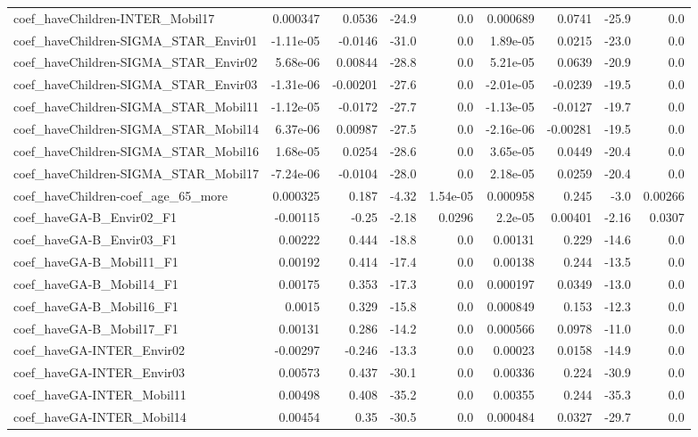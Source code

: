 \begin{tabular}{lrrrrrrrr}
coef_haveChildren-INTER_Mobil17 & 0.000347 & 0.0536 & -24.9 & 0.0 & 0.000689 & 0.0741 & -25.9 & 0.0 \\
coef_haveChildren-SIGMA_STAR_Envir01 & -1.11e-05 & -0.0146 & -31.0 & 0.0 & 1.89e-05 & 0.0215 & -23.0 & 0.0 \\
coef_haveChildren-SIGMA_STAR_Envir02 & 5.68e-06 & 0.00844 & -28.8 & 0.0 & 5.21e-05 & 0.0639 & -20.9 & 0.0 \\
coef_haveChildren-SIGMA_STAR_Envir03 & -1.31e-06 & -0.00201 & -27.6 & 0.0 & -2.01e-05 & -0.0239 & -19.5 & 0.0 \\
coef_haveChildren-SIGMA_STAR_Mobil11 & -1.12e-05 & -0.0172 & -27.7 & 0.0 & -1.13e-05 & -0.0127 & -19.7 & 0.0 \\
coef_haveChildren-SIGMA_STAR_Mobil14 & 6.37e-06 & 0.00987 & -27.5 & 0.0 & -2.16e-06 & -0.00281 & -19.5 & 0.0 \\
coef_haveChildren-SIGMA_STAR_Mobil16 & 1.68e-05 & 0.0254 & -28.6 & 0.0 & 3.65e-05 & 0.0449 & -20.4 & 0.0 \\
coef_haveChildren-SIGMA_STAR_Mobil17 & -7.24e-06 & -0.0104 & -28.0 & 0.0 & 2.18e-05 & 0.0259 & -20.4 & 0.0 \\
coef_haveChildren-coef_age_65_more & 0.000325 & 0.187 & -4.32 & 1.54e-05 & 0.000958 & 0.245 & -3.0 & 0.00266 \\
coef_haveGA-B_Envir02_F1 & -0.00115 & -0.25 & -2.18 & 0.0296 & 2.2e-05 & 0.00401 & -2.16 & 0.0307 \\
coef_haveGA-B_Envir03_F1 & 0.00222 & 0.444 & -18.8 & 0.0 & 0.00131 & 0.229 & -14.6 & 0.0 \\
coef_haveGA-B_Mobil11_F1 & 0.00192 & 0.414 & -17.4 & 0.0 & 0.00138 & 0.244 & -13.5 & 0.0 \\
coef_haveGA-B_Mobil14_F1 & 0.00175 & 0.353 & -17.3 & 0.0 & 0.000197 & 0.0349 & -13.0 & 0.0 \\
coef_haveGA-B_Mobil16_F1 & 0.0015 & 0.329 & -15.8 & 0.0 & 0.000849 & 0.153 & -12.3 & 0.0 \\
coef_haveGA-B_Mobil17_F1 & 0.00131 & 0.286 & -14.2 & 0.0 & 0.000566 & 0.0978 & -11.0 & 0.0 \\
coef_haveGA-INTER_Envir02 & -0.00297 & -0.246 & -13.3 & 0.0 & 0.00023 & 0.0158 & -14.9 & 0.0 \\
coef_haveGA-INTER_Envir03 & 0.00573 & 0.437 & -30.1 & 0.0 & 0.00336 & 0.224 & -30.9 & 0.0 \\
coef_haveGA-INTER_Mobil11 & 0.00498 & 0.408 & -35.2 & 0.0 & 0.00355 & 0.244 & -35.3 & 0.0 \\
coef_haveGA-INTER_Mobil14 & 0.00454 & 0.35 & -30.5 & 0.0 & 0.000484 & 0.0327 & -29.7 & 0.0 \\

\end{tabular}
